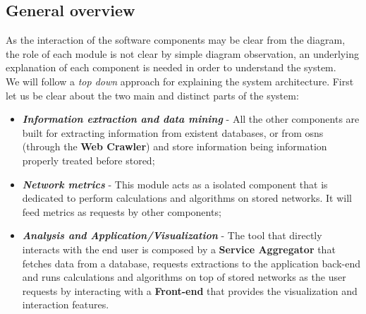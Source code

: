 \subsection{General overview}
As the interaction of the software components may be clear from the diagram, the role of each module is not clear by simple
diagram observation, an underlying explanation of each component is needed in order to understand the system.\\
\indent We will follow a \textit{top down} approach for explaining the system architecture. First let us be clear about the two
main and distinct parts of the system:
\begin{itemize}
    \item \textbf{\textit{Information extraction and data mining}} - All the other components are built for extracting information
    from existent databases, or from \glspl{osn} (through the \textbf{Web Crawler}) and store information being information properly treated before stored;
    \item \textbf{\textit{Network metrics}} - This module acts as a isolated component that is dedicated to perform calculations and algorithms on stored networks. It will feed metrics as requests by other components;
    \item \textbf{\textit{Analysis and Application/Visualization}} - The tool that directly interacts with the end user is composed by a \textbf{Service Aggregator} that fetches data from a database, requests extractions to the application back-end and runs calculations and algorithms on top of stored networks as the user requests by interacting with a \textbf{Front-end} that provides the visualization and interaction features.
\end{itemize}


